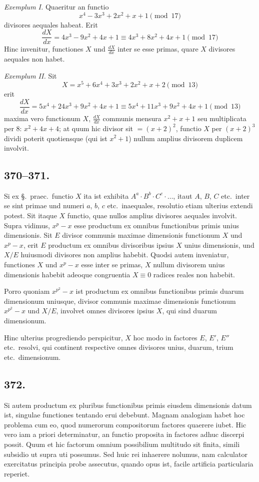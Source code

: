 \documentclass[12pt,a4paper]{article}
\newcommand{\Sec}{\S}
\begin{document}
\textit{Exemplum I.} Quaeritur an functio
\[
x^4-3x^3+2x^2+x+1 \pmod{17}
\]
divisores aequales habeat. Erit
\[
\frac{dX}{dx} = 4x^3-9x^2+4x+1 \equiv 4x^3+8x^2+4x+1 \pmod{17}
\]
Hinc invenitur, functiones $X$ und $\frac{dX}{dx}$ inter se esse primas, quare $X$ divisores aequales non habet.

\textit{Exemplum II.} Sit
\[
X = x^5+6x^4+3x^3+2x^2+x+2 \pmod{13}
\]
erit
\[
\frac{dX}{dx} = 5x^4+24x^3+9x^2+4x+1 \equiv 5x^4+11x^3+9x^2+4x+1 \pmod{13}
\]
maxima vero functionum $X$, $\frac{dX}{dx}$ communis mensura $x^2+x+1$ seu multiplicata per $8$: $x^2+4x+4$; at quum hic divisor sit $=(x+2)^2$, functio $X$ per $(x+2)^3$ dividi poterit quotiensque (qui ist $x^2+1$) nullum amplius divisorem duplicem involvit.

\subsection*{370--371.}

Si ex \Sec.~praec.~functio $X$ ita ist exhibita $A^a\cdot B^b\cdot C^c\cdot\ldots$, itaut $A$, $B$, $C$ etc.~inter se sint primae und numeri $a$, $b$, $c$ etc.~inaequales, resolutio etiam ulterius extendi potest. Sit itaque $X$ functio, quae nullos amplius divisores aequales involvit. Supra vidimus, $x^p-x$ esse productum ex omnibus functionibus primis unius dimensionis. Sit $E$ divisor communis maximae dimensionis functionum $X$ und $x^p-x$, erit $E$ productum ex omnibus divisoribus ipsius $X$ unius dimensionis, und $X/E$ huiusmodi divisores non amplius habebit. Quodsi autem inveniatur, functiones $X$ und $x^p-x$ esse inter se primas, $X$ nullum divisorem unius dimensionis habebit adeoque congruentia $X\equiv 0$ radices reales non habebit.

Porro quoniam $x^{p^2}-x$ ist productum ex omnibus functionibus primis duarum dimensionum uniusque, divisor communis maximae dimensionis functionum $x^{p^2}-x$ und $X/E$, involvet omnes divisores ipsius $X$, qui sind duarum dimensionum.

Hinc ulterius progrediendo perspicitur, $X$ hoc modo in factores $E$, $E'$, $E''$ etc.~resolvi, qui continent respective omnes divisores unius, duarum, trium etc.~dimensionum.

\subsection*{372.}

Si autem productum ex pluribus functionibus primis eiusdem dimensionis datum ist, singulae functiones tentando erui debebunt. Magnam analogiam habet hoc problema cum eo, quod numerorum compositorum factores quaerere iubet. Hic vero iam a priori determinatur, an functio proposita in factores adhuc discerpi possit. Quum et hic factorum omnium possibilium multitudo sit finita, simili subsidio ut supra uti possumus. Sed huic rei inhaerere nolumus, nam calculator exercitatus principia probe assecutus, quando opus ist, facile artificia particularia reperiet.
\end{document}
